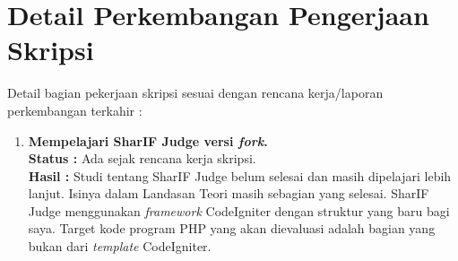 \documentclass[a4paper,twoside]{article}
\begin{document}
\section{Detail Perkembangan Pengerjaan Skripsi}
Detail bagian pekerjaan skripsi sesuai dengan rencana kerja/laporan perkembangan terkahir :
	\begin{enumerate}
		\item \textbf{Mempelajari SharIF Judge versi \textit{fork}.}\\
		{\bf Status :} Ada sejak rencana kerja skripsi.\\
		{\bf Hasil :} Studi tentang SharIF Judge belum selesai dan masih dipelajari lebih lanjut. Isinya dalam Landasan Teori masih sebagian yang selesai. SharIF Judge menggunakan \textit{framework} CodeIgniter dengan struktur yang baru bagi saya. Target kode program PHP yang akan dievaluasi adalah bagian yang bukan dari \textit{template} CodeIgniter. 
		

\end{enumerate}
\end{document}

